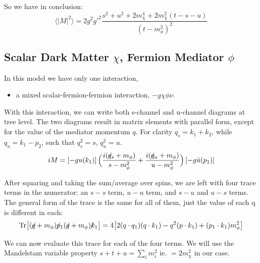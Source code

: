 \documentclass[11pt, oneside]{article}   	%
\newcommand{\fsl}[1]{\ensuremath{\mathrlap{\!\not{\phantom{#1}}}#1}}%
\begin{document}
So we have in conclusion: 
\[ \langle \left| M \right|^2 \rangle  = 2 g^2 g'^2 \frac{s^2 + u^2 + 2m_\chi^4 + 2m_\chi^2 (t - s - u) }{(t-m_\phi^2)^2} \]

\newpage
\subsection{\normalsize Scalar Dark Matter $\chi$, Fermion Mediator $\phi$ } 

In this model we have only one interaction, 
\begin{itemize}
\item a mixed scalar-fermion-fermion interaction, $-g \chi \phi \nu$.
\end{itemize}

With this interaction, we can write both s-channel and u-channel diagrams at tree level. The two diagrams result in matrix elements with parallel form, except for the value of the mediator momentum $q$. For clarity $q_s = k_1 + k_2$, while $q_u = k_1 - p_2$, such that $q_s^2 = s$, $q_u^2 = u$. 
\[ iM = \left[ -g u(k_1) \right] \Big( \frac{i(\fsl{q_s} + m_\phi)}{s - m_\phi^2} + \frac{i(\fsl{q_u} + m_\phi)}{u - m_\phi^2} \Big) \left[ -g \bar{u}(p_1) \right] \]

After squaring and taking the sum/average over spins, we are left with four trace terms in the numerator: an $s-s$ term, $u-u$ term, and $s-u$ and $u-s$ terms. The general form of the trace is the same for all of them, just the value of each q is different in each:
\[ \text{Tr} \big[ (\fsl{q} + m_\phi) \fsl{p_1} (\fsl{q} + m_\phi) \fsl{k_1} \big] = 4 \big[ 2(q \cdot q_1)(q \cdot k_1) - q^2 (p \cdot k_1) + (p_1 \cdot k_1) m_\phi^2 \big] \]

We can now evaluate this trace for each of the four terms. We will use the Mandelstam variable property $s + t + u = \sum_i m_i^2$ ie. $ = 2m_\chi^2$ in our case.
\end{document}
